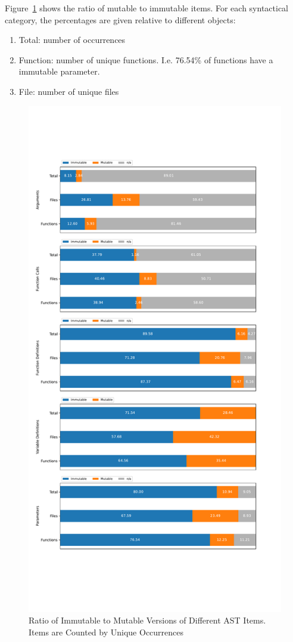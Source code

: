 \documentclass{book}
\theoremstyle{definition}
\begin{document}
Figure~\ref{fig:mutabillity_by_category} shows the ratio of mutable to immutable items. For each syntactical category, the percentages are given relative to different objects:

\begin{enumerate}
  \item Total: number of occurrences
  \item Function: number of unique functions. I.e. 76.54\% of functions have a immutable parameter.
  \item File: number of unique files
\end{enumerate}


\begin{figure}[h]
	\centering
	\includegraphics[width=0.9\linewidth, clip, trim={0.5cm 6cm 0.5cm 6cm}]{../mutability_by_category.pdf}
	\caption{Ratio of Immutable to Mutable Versions of Different AST Items. Items are Counted by Unique Occurrences}
	\label{fig:mutabillity_by_category}
\end{figure}
\end{document}
